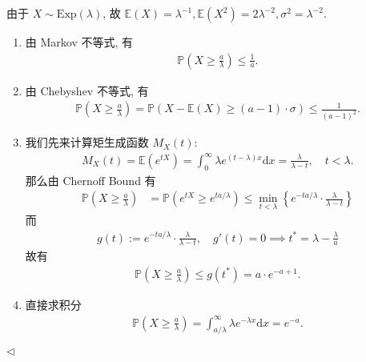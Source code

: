 \documentclass[11pt]{article}
\newenvironment{answer}[1][Solution]{\begin{trivlist}
    \item[\hskip \labelsep {\bfseries #1.}\hskip \labelsep]}{\hfill$\lhd$\end{trivlist}}
\newcommand\1{\mathds{1}}
\newcommand\E{\mathbb{E}}
\newcommand\PP{\mathbb{P}}
\newcommand\dd{\mathrm{d}}
\newcommand{\Exp}{\mathrm{Exp}}
\begin{document}
\begin{answer}
    由于 $X\sim \Exp(\lambda)$, 故 $\E(X) = \lambda^{-1}, \E(X^2) = 2\lambda^{-2}, \sigma^2 = \lambda^{-2}$.
    \begin{enumerate}[label=(\arabic*)]
        \item 由 Markov 不等式, 有
        \begin{align*}
            \PP\left(X \ge \frac{a}{\lambda}\right) \le \frac{1}{a}.
        \end{align*}
        \item 由 Chebyshev 不等式, 有
        \begin{align*}
            \PP\left(X \ge \frac{a}{\lambda}\right) = \PP\left(X - \E(X) \ge (a-1)\cdot \sigma\right) \le  \frac{1}{(a-1)^2}.
        \end{align*}
        \item 我们先来计算矩生成函数 $M_X(t)$:
        \begin{align*}
            M_X(t) = \E(e^{tX}) = \int_{0}^\infty \lambda e^{(t-\lambda) x} \dd x =  \frac{\lambda}{\lambda-t}, \quad t < \lambda.
        \end{align*}
        那么由 Chernoff Bound 有
        \begin{align*}
            \PP\left(X\ge \frac{a}{\lambda}\right)  &= \PP\left(e^{tX} \ge e^{ta/\lambda}\right) \le \min_{t<\lambda} \left\{e^{-ta/\lambda} \cdot \frac{\lambda}{\lambda-t} \right\} 
        \end{align*}
        而
        \begin{align*}
            g(t) := e^{-ta/\lambda} \cdot \frac{\lambda}{\lambda-t}, \quad g'(t) = 0 \implies t^* = \lambda - \frac{\lambda}{a}
        \end{align*}
        故有
        \begin{align*}
            \PP\left(X\ge \frac{a}{\lambda}\right) \le g(t^*) = a \cdot e^{-a+1}.
        \end{align*}
        \item 直接求积分
        \begin{align*}
            \PP\left(X\ge \frac{a}{\lambda}\right) = \int_{a/\lambda}^\infty \lambda e^{-\lambda x} \dd x = e^{-a}.
        \end{align*}
    \end{enumerate}
\end{answer}
\end{document}
